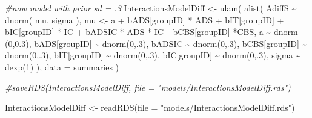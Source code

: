 \documentclass[
  10pt,
  dvipsnames, enabledeprecatedfontcommands]{scrartcl}
\newenvironment{Shaded}{\begin{snugshade}}{\end{snugshade}}
\newcommand{\AttributeTok}[1]{\textcolor[rgb]{0.77,0.63,0.00}{#1}}
\newcommand{\CommentTok}[1]{\textcolor[rgb]{0.56,0.35,0.01}{\textit{#1}}}
\newcommand{\DecValTok}[1]{\textcolor[rgb]{0.00,0.00,0.81}{#1}}
\newcommand{\FloatTok}[1]{\textcolor[rgb]{0.00,0.00,0.81}{#1}}
\newcommand{\FunctionTok}[1]{\textcolor[rgb]{0.00,0.00,0.00}{#1}}
\newcommand{\NormalTok}[1]{#1}
\newcommand{\OtherTok}[1]{\textcolor[rgb]{0.56,0.35,0.01}{#1}}
\newcommand{\SpecialCharTok}[1]{\textcolor[rgb]{0.00,0.00,0.00}{#1}}
\newcommand{\StringTok}[1]{\textcolor[rgb]{0.31,0.60,0.02}{#1}}
\begin{document}
\begin{Shaded}
\begin{Highlighting}[]
\CommentTok{\#now model with prior sd = .3}
\NormalTok{InteractionsModelDiff }\OtherTok{\textless{}{-}} \FunctionTok{ulam}\NormalTok{(}
  \FunctionTok{alist}\NormalTok{(}
\NormalTok{    AdiffS }\SpecialCharTok{\textasciitilde{}} \FunctionTok{dnorm}\NormalTok{( mu, sigma ),}
\NormalTok{    mu }\OtherTok{\textless{}{-}}\NormalTok{ a }\SpecialCharTok{+}\NormalTok{ bADS[groupID] }\SpecialCharTok{*}\NormalTok{ ADS }\SpecialCharTok{+}\NormalTok{  bIT[groupID] }\SpecialCharTok{+}\NormalTok{ bIC[groupID] }\SpecialCharTok{*}\NormalTok{ IC }\SpecialCharTok{+}
\NormalTok{    bADSIC }\SpecialCharTok{*}\NormalTok{ ADS }\SpecialCharTok{*}\NormalTok{ IC}\SpecialCharTok{+}\NormalTok{ bCBS[groupID] }\SpecialCharTok{*}\NormalTok{CBS,}
\NormalTok{    a }\SpecialCharTok{\textasciitilde{}} \FunctionTok{dnorm}\NormalTok{ (}\DecValTok{0}\NormalTok{,}\FloatTok{0.3}\NormalTok{),}
\NormalTok{    bADS[groupID] }\SpecialCharTok{\textasciitilde{}} \FunctionTok{dnorm}\NormalTok{(}\DecValTok{0}\NormalTok{,.}\DecValTok{3}\NormalTok{),}
\NormalTok{    bADSIC }\SpecialCharTok{\textasciitilde{}} \FunctionTok{dnorm}\NormalTok{(}\DecValTok{0}\NormalTok{,.}\DecValTok{3}\NormalTok{),}
\NormalTok{    bCBS[groupID] }\SpecialCharTok{\textasciitilde{}} \FunctionTok{dnorm}\NormalTok{(}\DecValTok{0}\NormalTok{,.}\DecValTok{3}\NormalTok{),}
\NormalTok{    bIT[groupID] }\SpecialCharTok{\textasciitilde{}} \FunctionTok{dnorm}\NormalTok{(}\DecValTok{0}\NormalTok{,.}\DecValTok{3}\NormalTok{),}
\NormalTok{    bIC[groupID] }\SpecialCharTok{\textasciitilde{}} \FunctionTok{dnorm}\NormalTok{(}\DecValTok{0}\NormalTok{,.}\DecValTok{3}\NormalTok{),}
\NormalTok{    sigma  }\SpecialCharTok{\textasciitilde{}} \FunctionTok{dexp}\NormalTok{(}\DecValTok{1}\NormalTok{)}
\NormalTok{  ),}
  \AttributeTok{data =}\NormalTok{ summaries}
\NormalTok{)}

\CommentTok{\#saveRDS(InteractionsModelDiff, file = "models/InteractionsModelDiff.rds")}

\NormalTok{InteractionsModelDiff }\OtherTok{\textless{}{-}} \FunctionTok{readRDS}\NormalTok{(}\AttributeTok{file =} \StringTok{"models/InteractionsModelDiff.rds"}\NormalTok{)}


\end{Highlighting}
\end{Shaded}
\end{document}
